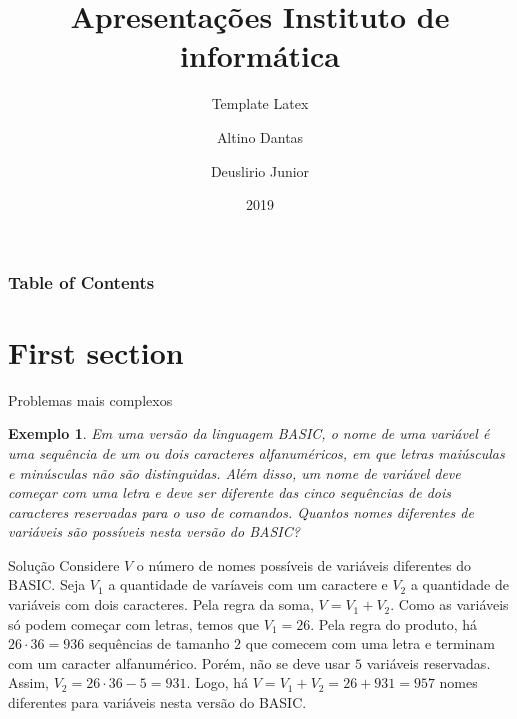 \documentclass[aspectratio=169,t,xcolor=table]{beamer}
\newtheorem{ex}{Exemplo}
\begin{document}
\title[Inf UFG]{Apresentações Instituto de informática}
\subtitle{Template Latex}

\author{Altino Dantas \and Deuslirio Junior}

\date{2019}
\frame[noframenumbering]{\titlepage}




\begin{frame}
\frametitle{Table of Contents}
\tableofcontents
\end{frame}

\section{First section}

 \begin{frame}{Problemas mais complexos}
\footnotesize
  \begin{ex}
Em uma versão da linguagem BASIC, o nome de uma variável é uma sequência de um ou dois caracteres alfanuméricos, em que letras maiúsculas e minúsculas não são distinguidas. Além disso, um nome de variável deve começar com uma letra e deve ser diferente das cinco sequências de dois caracteres reservadas para o uso de comandos. Quantos nomes diferentes de variáveis são possíveis nesta versão do BASIC?
  \end{ex}

\begin{block}{Solução}
Considere $V$ o número de nomes possíveis de variáveis diferentes do BASIC. Seja $V_1$ a quantidade de varíaveis com um caractere e $V_2$ a quantidade de variáveis com dois caracteres. Pela regra da soma, $V=V_1+V_2$. Como as variáveis só podem começar com letras, temos que $V_1=26$. Pela regra do produto, há $26\cdot 36=936$ sequências de tamanho $2$ que comecem com uma letra e terminam com um caracter alfanumérico. Porém, não se deve usar $5$ variáveis reservadas. Assim, $V_2=26\cdot 36-5=931$. Logo, há $V=V_1+V_2 = 26+931=957$ nomes diferentes para variáveis nesta versão do BASIC.
  \end{block}

 \end{frame}
\end{document}
